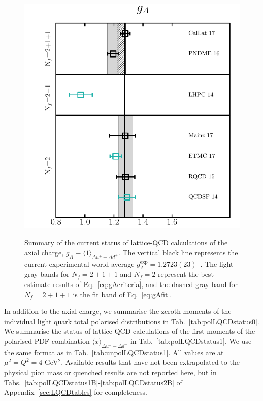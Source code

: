 \begin{figure}[!t]
\centering
\includegraphics[scale=0.7]{plots/ga_summary.pdf}\\
\caption{\small Summary of the current status of lattice-QCD calculations of 
the axial charge, $g_A\equiv \langle 1\rangle_{\Delta u^+-\Delta d^+}$.
%
The vertical black line represents the current experimental world average 
$g_A^{\mathrm{exp}} = 1.2723(23)$~\cite{Olive:2016xmw}. 
%
The light gray bands for $N_f=2+1+1$ and $N_f=2$ represent the best-estimate 
results of Eq.~\eqref{eq:gAcriteria}, and the dashed gray band for
$N_f=2+1+1$ is the fit band of Eq.~\eqref{eq:gAfit}.}    
\label{fig:gaLQCDstatus}
\end{figure}

In addition to the axial charge, we summarise the zeroth moments of the 
individual light quark total polarised distributions in 
Tab.~\ref{tab:polLQCDstatus0}. 
%
We summarise the status of lattice-QCD calculations of the
first moments of the polarised PDF combination 
$\langle x \rangle_{\Delta u^- - \Delta d^-}$ in Tab.~\ref{tab:polLQCDstatus1}. 
%
We use the same format as in Tab.~\ref{tab:unpolLQCDstatus1}.
%
All values are at $\mu^2=Q^2=4$ GeV$^2$.
%
Available results that have not been extrapolated to the physical pion mass
or quenched results are not reported here, but in 
Tabs.~\ref{tab:polLQCDstatus1B}-\ref{tab:polLQCDstatus2B} of
Appendix~\ref{sec:LQCDtables} for completeness.

